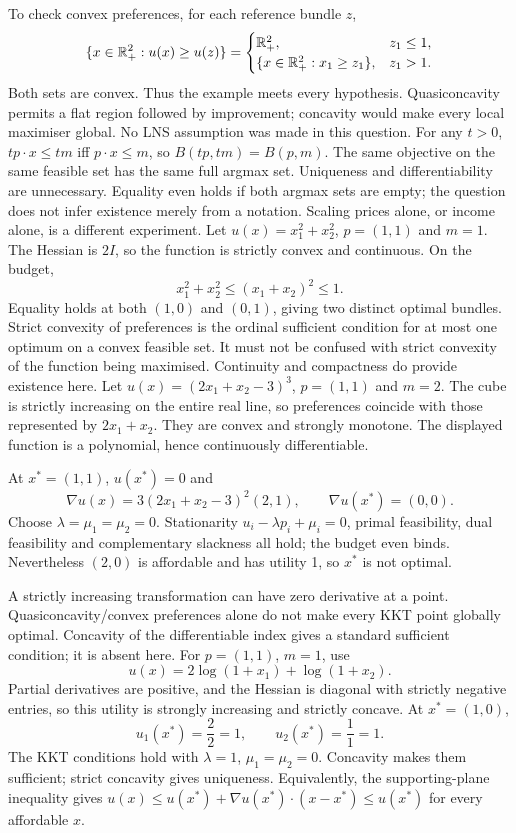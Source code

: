 To check convex preferences, for each reference bundle $z$,
\[
 \{x\in\mathbb R_+^2:u(x)\ge u(z)\}=
 \begin{cases}
 \mathbb R_+^2,&z_1\le1,\\
 \{x\in\mathbb R_+^2:x_1\ge z_1\},&z_1>1.
 \end{cases}
\]
Both sets are convex. Thus the example meets every hypothesis. Quasiconcavity permits a flat region followed by improvement; concavity would make every local maximiser global. No LNS assumption was made in this question.
For any $t>0$, $tp\cdot x\le tm$ iff $p\cdot x\le m$, so $B(tp,tm)=B(p,m)$. The same objective on the same feasible set has the same full argmax set. Uniqueness and differentiability are unnecessary. Equality even holds if both argmax sets are empty; the question does not infer existence merely from a notation. Scaling prices alone, or income alone, is a different experiment.
Let $u(x)=x_1^2+x_2^2$, $p=(1,1)$ and $m=1$. The Hessian is $2I$, so the function is strictly convex and continuous. On the budget,
\[
 x_1^2+x_2^2\le(x_1+x_2)^2\le1.
\]
Equality holds at both $(1,0)$ and $(0,1)$, giving two distinct optimal bundles. Strict convexity of preferences is the ordinal sufficient condition for at most one optimum on a convex feasible set. It must not be confused with strict convexity of the function being maximised. Continuity and compactness do provide existence here.
\clearpage
{}
Let $u(x)=(2x_1+x_2-3)^3$, $p=(1,1)$ and $m=2$. The cube is strictly increasing on the entire real line, so preferences coincide with those represented by $2x_1+x_2$. They are convex and strongly monotone. The displayed function is a polynomial, hence continuously differentiable.

At $x^*=(1,1)$, $u(x^*)=0$ and
\[
 \nabla u(x)=3(2x_1+x_2-3)^2(2,1),\qquad \nabla u(x^*)=(0,0).
\]
Choose $\lambda=\mu_1=\mu_2=0$. Stationarity $u_i-\lambda p_i+\mu_i=0$, primal feasibility, dual feasibility and complementary slackness all hold; the budget even binds. Nevertheless $(2,0)$ is affordable and has utility 1, so $x^*$ is not optimal.

A strictly increasing transformation can have zero derivative at a point. Quasiconcavity/convex preferences alone do not make every KKT point globally optimal. Concavity of the differentiable index gives a standard sufficient condition; it is absent here.
For $p=(1,1)$, $m=1$, use
\[
 u(x)=2\log(1+x_1)+\log(1+x_2).
\]
Partial derivatives are positive, and the Hessian is diagonal with strictly negative entries, so this utility is strongly increasing and strictly concave. At $x^*=(1,0)$,
\[
 u_1(x^*)=\frac{2}{2}=1,\qquad u_2(x^*)=\frac{1}{1}=1.
\]
The KKT conditions hold with $\lambda=1$, $\mu_1=\mu_2=0$. Concavity makes them sufficient; strict concavity gives uniqueness. Equivalently, the supporting-plane inequality gives $u(x)\le u(x^*)+\nabla u(x^*)\cdot(x-x^*)\le u(x^*)$ for every affordable $x$.

